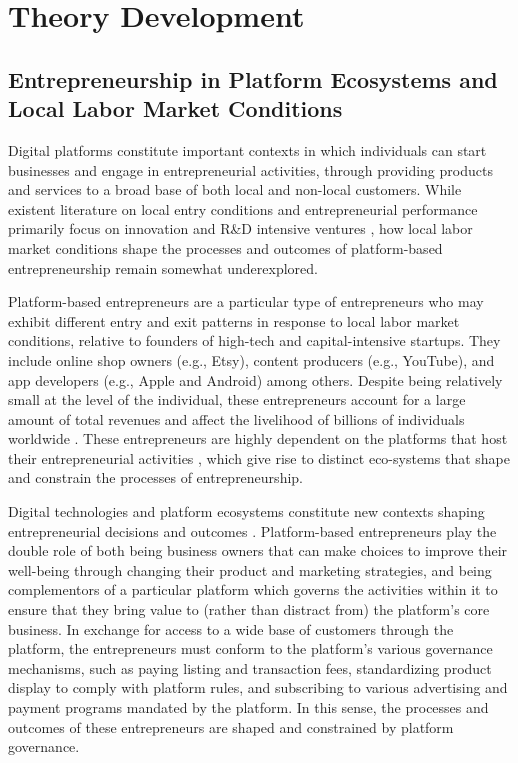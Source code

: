 \documentclass[letterpaper,12pt]{article}
\begin{document}
\section{Theory Development}

\subsection{Entrepreneurship in Platform Ecosystems and Local Labor Market Conditions}

Digital platforms constitute important contexts in which individuals can start businesses and engage in entrepreneurial activities, through providing products and services to a broad base of both local and non-local customers. While existent literature on local entry conditions and entrepreneurial performance primarily focus on innovation and R\&D intensive ventures \citep{conti2021lowering,bias2022great,hacamo_forced_2022}, how local labor market conditions shape the processes and outcomes of platform-based entrepreneurship remain somewhat underexplored.

Platform-based entrepreneurs are a particular type of entrepreneurs who may exhibit different entry and exit patterns in response to local labor market conditions, relative to founders of high-tech and capital-intensive startups. They include online shop owners (e.g., Etsy), content producers (e.g., YouTube), and app developers (e.g., Apple and Android) among others. Despite being relatively small at the level of the individual, these entrepreneurs account for a large amount of total revenues and affect the livelihood of billions of individuals worldwide \citep{aldrich_unicorns_2018,bonina2021digital}. These entrepreneurs are highly dependent on the platforms that host their entrepreneurial activities \citep{cutolo_platform-dependent_2021}, which give rise to distinct eco-systems that shape and constrain the processes of entrepreneurship. 


Digital technologies and platform ecosystems constitute new contexts shaping entrepreneurial decisions and outcomes \citep{nambisan_digital_2017,eckhardt_open_2018,nambisan_costs_2021}. Platform-based entrepreneurs play the double role of both being business owners that can make choices to improve their well-being through changing their product and marketing strategies, and being complementors of a particular platform which governs the activities within it to ensure that they bring value to (rather than distract from) the platform's core business. In exchange for access to a wide base of customers through the platform, the entrepreneurs must conform to the platform's various governance mechanisms, such as paying listing and transaction fees, standardizing product display to comply with platform rules, and subscribing to various advertising and payment programs mandated by the platform. In this sense, the processes and outcomes of these entrepreneurs are shaped and constrained by platform governance.
\end{document}
